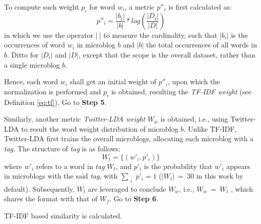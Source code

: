 To compute such weight $p_i$ for word $w_i$, a metric $p''_i$ is first calculated as:
\begin{equation}
\label{eq:tf-w}
p''_i = \frac{|b_i|}{|b|} * log(\frac{|D_i|}{|D|})
\end{equation}
in which we use the operator $|\ |$ to measure the cardinality, such that $|b_i|$ is the occurrences of word $w_i$ in microblog $b$ and $|b|$ the total occurrences of all words in $b$.
Ditto for $|D_i|$ and $|D|$, except that the scope is the overall dataset, rather than a single microblog $b$.

Hence, each word $w_i$ shall get an initial weight of $p''_i$, upon which the normalization is performed and $p_i$ is obtained, resulting the \textit{TF-IDF weight} (see Definition \ref{eq:tf}).
Go to \textbf{Step 5}.

 Similarly, another metric \textit{Twitter-LDA weight} $W_w$ is obtained, i.e., using Twitter-LDA  %
to result the word weight distribution of microblog $b$.
Unlike TF-IDF, Twitter-LDA first trains the overall microblogs, allocating each microblog with a \textit{tag}.
%
The structure of \textit{tag} is as follows:
\begin{equation}
\label{eq:tw-tag}
W_t = \{(w'_i, p'_i)\}
\end{equation}
where $w'_i$ refers to a word in \textit{tag} $W_t$, and $p'_i$ is the probability that $w'_i$ appears in microblogs with the said \textit{tag}, with $\sum_{\substack{i}} p'_i = 1$ ($|W_t|\ =\ 30$ in this work by default).
%
Subsequently, $W_t$ are leveraged to conclude $W_w$, i.e., $W_w\ =\ W_t$ , which shares the format with that of $W_f$.
Go to \textbf{Step 6}.

 TF-IDF based similarity is calculated.



